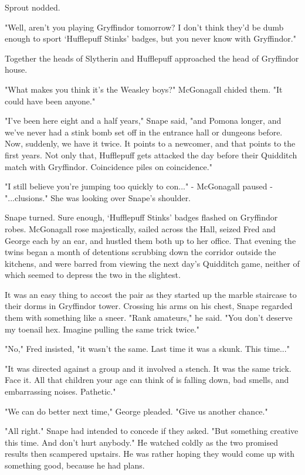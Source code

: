 Sprout nodded.

"Well, aren't you playing Gryffindor tomorrow? I don't think they'd be dumb enough to sport `Hufflepuff Stinks' badges, but you never know with Gryffindor."

Together the heads of Slytherin and Hufflepuff approached the head of Gryffindor house.

"What makes you think it's the Weasley boys?" McGonagall chided them. "It could have been anyone."

"I've been here eight and a half years," Snape said, "and Pomona longer, and we've never had a stink bomb set off in the entrance hall or dungeons before. Now, suddenly, we have it twice. It points to a newcomer, and that points to the first years. Not only that, Hufflepuff gets attacked the day before their Quidditch match with Gryffindor. Coincidence piles on coincidence."

"I still believe you're jumping too quickly to con..." - McGonagall paused - "...clusions." She was looking over Snape's shoulder.

Snape turned. Sure enough, `Hufflepuff Stinks' badges flashed on Gryffindor robes. McGonagall rose majestically, sailed across the Hall, seized Fred and George each by an ear, and hustled them both up to her office. That evening the twins began a month of detentions scrubbing down the corridor outside the kitchens, and were barred from viewing the next day's Quidditch game, neither of which seemed to depress the two in the slightest.

It was an easy thing to accost the pair as they started up the marble staircase to their dorms in Gryffindor tower. Crossing his arms on his chest, Snape regarded them with something like a sneer. "Rank amateurs," he said. "You don't deserve my toenail hex. Imagine pulling the same trick twice."

"No," Fred insisted, "it wasn't the same. Last time it was a skunk. This time..."

"It was directed against a group and it involved a stench. It was the same trick. Face it. All that children your age can think of is falling down, bad smells, and embarrassing noises. Pathetic."

"We can do better next time," George pleaded. "Give us another chance."

"All right." Snape had intended to concede if they asked. "But something creative this time. And don't hurt anybody." He watched coldly as the two promised results then scampered upstairs. He was rather hoping they would come up with something good, because he had plans.

